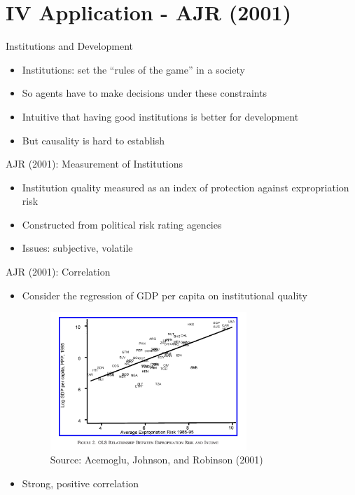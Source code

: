\documentclass[11pt,notes=hide,aspectratio=169,mathserif]{beamer}
\begin{document}
\section*{IV Application  - AJR (2001)}
\begin{frame}{Institutions and Development}
\begin{itemize}
\item Institutions: set the ``rules of the game'' in a society
\item So agents have to make decisions under these constraints
\item Intuitive that having good institutions is better for development
\item But causality is hard to establish
\end{itemize}
\end{frame}

\begin{frame}{AJR (2001): Measurement of Institutions}
\begin{itemize}
\item Institution quality measured as an index of protection against expropriation risk
\item Constructed from political risk rating agencies
\item Issues: subjective, volatile 
\end{itemize}
\end{frame}

\begin{frame}{AJR (2001): Correlation}
\begin{itemize}
\item Consider the regression of GDP per capita on institutional quality
\begin{figure}
\centering
\includegraphics[width=0.7\textwidth]{inputs/AJR1.png}
\caption{Source: Acemoglu, Johnson, and Robinson (2001)}
\end{figure}
\item Strong, positive correlation
\end{itemize}
\end{frame}
\end{document}
